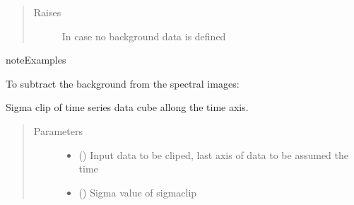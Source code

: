 \documentclass[a4paper,10pt,english]{sphinxmanual}
\begin{document}
\begin{fulllineitems}
\begin{fulllineitems}
\begin{quote}
\begin{description}
\item[{Raises}] \leavevmode
{} \textendash{} In case no background data is defined

\end{description}\end{quote}

\begin{sphinxadmonition}{note}{Examples}

To subtract the background from the spectral images:

%
\begin{sphinxVerbatim}[commandchars=\\\{\}]
\end{sphinxVerbatim}
\end{sphinxadmonition}

\end{fulllineitems}


\begin{fulllineitems}
\label{\detokenize{cascade.TSO:cascade.TSO.TSO.TSOSuite.sigma_clip_data_cosmic}}
Sigma clip of time series data cube allong the time axis.
\begin{quote}\begin{description}
\item[{Parameters}] \leavevmode\begin{itemize}
\item {} 
 () \textendash{} Input data to be cliped, last axis of data to be assumed the time

\item {} 
 () \textendash{} Sigma value of sigmaclip

\end{itemize}


\end{description}
\end{quote}
\end{fulllineitems}
\end{fulllineitems}
\end{document}
